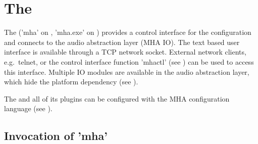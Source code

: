
\section{The \mhad{}}\label{sec:linuxmhaserver}\label{sec:frameworks}

The \mhad{} ('mha' on \Linux{}, 'mha.exe' on \Windows{}) provides a
control interface for the configuration and connects to the audio
abstraction layer (MHA IO).
%
The text based user interface is available through a TCP network
socket.
%
External network clients, e.g.\ telnet, or the \Matlab{} control
interface function 'mhactl' (see ) can be used
to access this interface.
%
Multiple IO modules are available in the audio abstraction layer,
which hide the platform dependency (see
).
%

The \mhad{} and all of its plugins can be configured with the MHA
configuration language (see ).
%


\subsection{Invocation of 'mha'}

